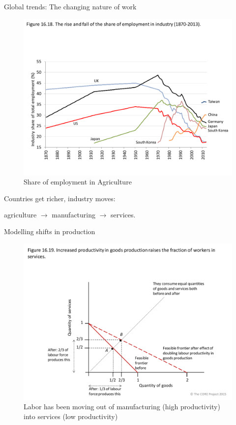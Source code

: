 \documentclass[11pt,aspectratio=43,usenames,dvipsnames]{beamer}
\theoremstyle{definition}
\begin{document}
\begin{frame}{Global trends: The changing nature of work}
\label{slide:Global_trends__The_changing_nature_of_work}
    \begin{figure}
        \centering
        \caption{Share of employment in Agriculture}
        \includegraphics[trim={0cm, 1.8cm, 0cm, 5cm}, clip, width=\textwidth]{./figures/17.pdf}
    \end{figure}

        Countries get richer, industry moves:

        agriculture $ \rightarrow  $ manufacturing $ \rightarrow  $ services.

\end{frame}

\begin{frame}{Modelling shifts in production}
\label{slide:Modelling_shifts_in_production}
    \begin{figure}
        \centering
        \includegraphics[trim = {0cm, 0cm, 0cm, 4.5cm}, clip, width=\textwidth]{./figures/18.pdf}
        \caption{Labor has been moving out of manufacturing (high productivity) into services (low productivity)}
    \end{figure}

\end{frame}
\end{document}
